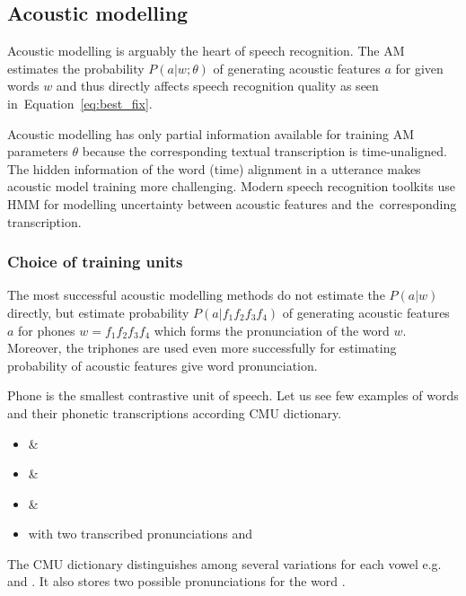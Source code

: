 
\subsection{Acoustic modelling}
\label{sub:am}
Acoustic modelling is arguably the heart of speech recognition.
The \ac{AM} estimates the probability $P(a|w; \theta)$ of generating acoustic features $a$ for given words $w$ and thus directly affects speech recognition quality as seen in~Equation~\ref{eq:best_fix}.

Acoustic modelling has only partial information available for training \ac{AM} parameters $\theta$ because the corresponding textual transcription is time-unaligned.
The hidden information of the word (time) alignment in a utterance makes acoustic model training more challenging.
Modern speech recognition toolkits use \acl{HMM} for modelling uncertainty between acoustic features and the~corresponding transcription. 

\subsubsection*{Choice of training units}
The most successful acoustic modelling methods do not estimate the $P(a|w)$ directly, but estimate probability $P(a|f_1f_2f_3f_4)$ of generating acoustic features $a$ for phones $w=f_1f_2f_3f_4$ which forms the pronunciation of the word $w$. Moreover, the triphones are used even more successfully for estimating probability of acoustic features give word pronunciation.

Phone is the smallest contrastive unit of speech. 
Let us see few examples of words and their phonetic transcriptions according CMU dictionary\cite{weide1998cmu}.
\begin{itemize}
    \item {} \& 
    \item {} \& 
    \item {} \& 
    \item {} with two transcribed pronunciations  and 
\end{itemize}
The CMU dictionary distinguishes among several variations for each vowel e.g.  and .
It also stores two possible pronunciations for the word .

